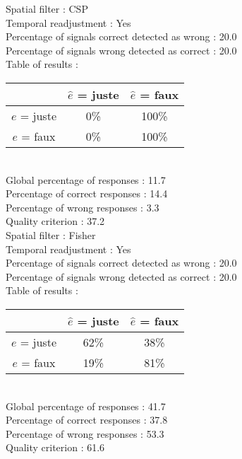 Spatial filter : CSP \\
Temporal readjustment : Yes \\
Percentage of signals correct detected as wrong :   20.0 \\
Percentage of signals wrong detected as correct :   20.0 \\
Table of results : \\
\begin{tabular}{|c|c|c|}
\hline				& $\hat{e}$ = juste & $\hat{e}$ = faux \\
\hline  $e$ = juste	&      0\%			&    100\%		\\
\hline  $e$ = faux	&      0\%			&    100\%		\\
\hline
\end{tabular}\\
Global percentage of responses :   11.7 \\
Percentage of correct responses :   14.4 \\
Percentage of wrong responses :    3.3 \\
Quality criterion :   37.2 \\

Spatial filter : Fisher \\
Temporal readjustment : Yes \\
Percentage of signals correct detected as wrong :   20.0 \\
Percentage of signals wrong detected as correct :   20.0 \\
Table of results : \\
\begin{tabular}{|c|c|c|}
\hline				& $\hat{e}$ = juste & $\hat{e}$ = faux \\
\hline  $e$ = juste	&     62\%			&     38\%		\\
\hline  $e$ = faux	&     19\%			&     81\%		\\
\hline
\end{tabular}\\
Global percentage of responses :   41.7 \\
Percentage of correct responses :   37.8 \\
Percentage of wrong responses :   53.3 \\
Quality criterion :   61.6 \\


